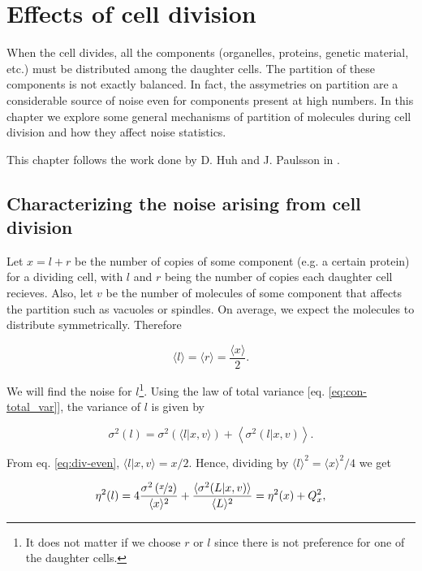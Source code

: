 \chapter{Effects of cell division}
\label{ch:div}

When the cell divides, all the components (organelles, proteins, genetic material, etc.) must be distributed among the daughter cells. The partition of these components is not exactly balanced. In fact, the assymetries on partition are a considerable source of noise even for components present at high numbers. In this chapter we explore some general mechanisms of partition of molecules during cell division and how they affect noise statistics.

This chapter follows the work done by D. Huh and J. Paulsson in \cite{huh11b}.

\section{Characterizing the noise arising from cell division}

Let $x = l+r$ be the number of copies of some component (e.g. a certain protein) for a dividing cell, with $l$ and $r$ being the number of copies each daughter cell recieves. Also, let $v$ be the number of molecules of some component that affects the partition such as vacuoles or spindles. On average, we expect the molecules to distribute symmetrically. Therefore

\begin{equation}
  \label{eq:div-even}
  \langle l\rangle = \langle r\rangle = \frac{\langle x\rangle}{2}.
\end{equation}

We will find the noise for $l$\footnote{It does not matter if we choose $r$ or $l$ since there is not preference for one of the daughter cells.}. Using the law of total variance [eq. \eqref{eq:con-total_var}], the variance of $l$ is given by

\begin{equation*}
  \sigma^2(l) = \sigma^2\left(\langle l|x,v\rangle\right) + \left\langle\sigma^2(l|x,v)\right\rangle.
\end{equation*}

From eq. \eqref{eq:div-even}, $\langle l|x,v\rangle = x/2$. Hence, dividing by $\langle l\rangle^2 = \langle x\rangle^2/4$ we get

\begin{equation}
  \label{eq:div-noises}
  \eta^2(l) = 4\frac{\sigma^2\left(\nicefrac{x}{2}\right)}{\langle x\rangle^2}+\frac{\langle\sigma^2(L|x,v)\rangle}{\langle L\rangle^2}=\eta^2(x) + Q_x^2,
\end{equation}


